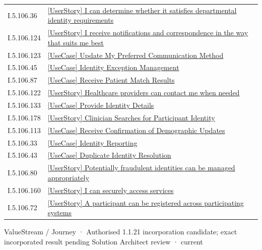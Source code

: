 \begin{longtable}{p{.22\linewidth}p{.73\linewidth}}
I.5.106.36 & \hyperref[element:e5e6edb8f0f34ca8b1c668fe8bfb3290]{[UserStory] I can determine whether it satisfies departmental identity requirements} \\
I.5.106.124 & \hyperref[element:e8f0133618c84ccfb00cb71dc39bb26e]{[UserStory] I receive notifications and correspondence in the way that suits me best} \\
I.5.106.123 & \hyperref[element:eb0dce0612fe469da334354849298845]{[UseCase] Update My Preferred Communication Method} \\
I.5.106.45 & \hyperref[element:ec15dccd9b2a40b7beed61e034dfd580]{[UseCase] Identity Exception Management} \\
I.5.106.87 & \hyperref[element:ec4ae04ec46a4838965fe6f575b61047]{[UseCase] Receive Patient Match Results} \\
I.5.106.122 & \hyperref[element:ecf41a37abc9480bb5b389659f6d146f]{[UserStory] Healthcare providers can contact me when needed} \\
I.5.106.133 & \hyperref[element:eec70c0c8b904d4cb1abfb1187477fd4]{[UseCase] Provide Identity Details} \\
I.5.106.178 & \hyperref[element:eefbc5ccdfd042729f2a35074f4fb71b]{[UserStory] Clinician Searches for Participant Identity} \\
I.5.106.113 & \hyperref[element:f41e615293a74880a8008e675d602148]{[UseCase] Receive Confirmation of Demographic Updates} \\
I.5.106.33 & \hyperref[element:f7e0c3830dde44d097e342ce1129ff69]{[UseCase] Identity Reporting} \\
I.5.106.43 & \hyperref[element:f87ef522eb964d60908fa3f69b77e022]{[UseCase] Duplicate Identity Resolution} \\
I.5.106.80 & \hyperref[element:fc8ea880a2f34f10ac79cd4a14d4fe9c]{[UserStory] Potentially fraudulent identities can be managed appropriately} \\
I.5.106.160 & \hyperref[element:fd9792a989594546b981ef0cb49b21de]{[UserStory] I can securely access services} \\
I.5.106.72 & \hyperref[element:fdbec18ac8754442af913f787fad9c5b]{[UserStory] A participant can be registered across participating systems} \\
\end{longtable}
\label{element:f0ce31d5b71c4c5ab37ade566b224808}
{\small ValueStream / Journey · Authorised 1.1.21 incorporation candidate; exact incorporated result pending Solution Architect review · current}\par

